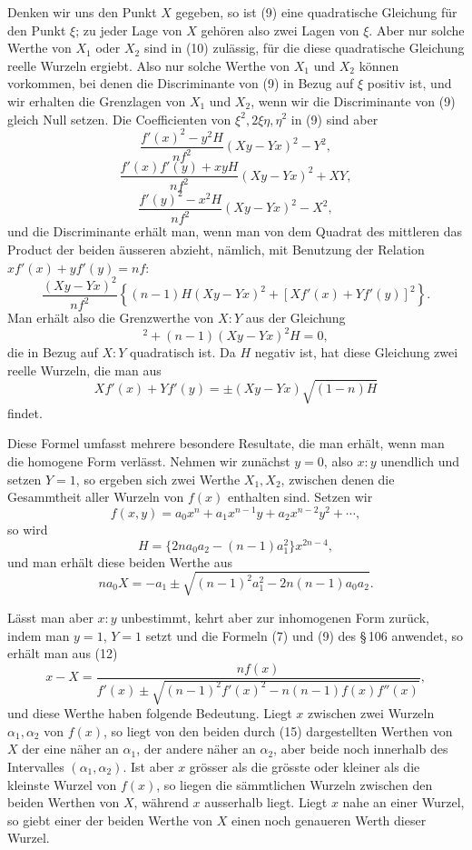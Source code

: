 \documentclass[11pt]{article}
\begin{document}
Denken wir uns den Punkt $X$ gegeben, so ist (9) eine quadratische Gleichung für den Punkt $\xi$; zu jeder Lage von $X$ gehören also zwei Lagen von $\xi$. Aber nur solche Werthe von $X_1$ oder $X_2$ sind in (10) zulässig, für die diese quadratische Gleichung reelle Wurzeln ergiebt. Also nur solche Werthe von $X_1$ und $X_2$ können vorkommen, bei denen die Discriminante von (9) in Bezug auf $\xi$ positiv ist, und wir erhalten die Grenzlagen von $X_1$ und $X_2$, wenn wir die Discriminante von (9) gleich Null setzen. Die Coefficienten von $\xi^2,2\xi\eta,\eta^2$ in (9) sind aber
\[
\frac{f'(x)^2-y^2H}{n f^2}(Xy-Yx)^2-Y^2,
\]
\[
\frac{f'(x)f'(y)+xyH}{n f^2}(Xy-Yx)^2+XY,
\]
\[
\frac{f'(y)^2-x^2H}{n f^2}(Xy-Yx)^2-X^2,
\]
und die Discriminante erhält man, wenn man von dem Quadrat des mittleren das Product der beiden äusseren abzieht, nämlich, mit Benutzung der Relation $xf'(x)+yf'(y)=nf$:
\[
        \frac{(Xy-Yx)^2}{n f^2}
        \left\{(n-1)H(Xy-Yx)^2+[Xf'(x)+Yf'(y)]^2\right\}.
\]
Man erhält also die Grenzwerthe von $X:Y$ aus der Gleichung
\begin{equation}
        [Xf'(x)+Yf'(y)]^2+(n-1)(Xy-Yx)^2H=0,
\tag{11}
\end{equation}
die in Bezug auf $X:Y$ quadratisch ist. Da $H$ negativ ist, hat diese Gleichung zwei reelle Wurzeln, die man aus
\begin{equation}
        Xf'(x)+Yf'(y)=\pm (Xy-Yx)\sqrt{(1-n)H}
\tag{12}
\end{equation}
findet.

Diese Formel umfasst mehrere besondere Resultate, die man erhält, wenn man die homogene Form verlässt. Nehmen wir zunächst $y=0$, also $x:y$ unendlich und setzen $Y=1$, so ergeben sich zwei Werthe $X_1,X_2$, zwischen denen die Gesammtheit aller Wurzeln von $f(x)$ enthalten sind. Setzen wir
\[
        f(x,y)=a_0x^n+a_1x^{n-1}y+a_2x^{n-2}y^2+\cdots,
\]
so wird
\begin{equation}
        H=\{2na_0a_2-(n-1)a_1^2\}x^{2n-4},
\tag{13}
\end{equation}
und man erhält diese beiden Werthe aus
\begin{equation}
        na_0X=-a_1\pm\sqrt{(n-1)^2a_1^2-2n(n-1)a_0a_2}.
\tag{14}
\end{equation}

Lässt man aber $x:y$ unbestimmt, kehrt aber zur inhomogenen Form zurück, indem man $y=1$, $Y=1$ setzt und die Formeln (7) und (9) des \S\,106 anwendet, so erhält man aus (12)
\begin{equation}
        x-X=\frac{n f(x)}
        {f'(x)\pm\sqrt{(n-1)^2f'(x)^2-n(n-1)f(x)f''(x)}},
\tag{15}
\end{equation}
und diese Werthe haben folgende Bedeutung. Liegt $x$ zwischen zwei Wurzeln $\alpha_1,\alpha_2$ von $f(x)$, so liegt von den beiden durch (15) dargestellten Werthen von $X$ der eine näher an $\alpha_1$, der andere näher an $\alpha_2$, aber beide noch innerhalb des Intervalles $(\alpha_1,\alpha_2)$. Ist aber $x$ grösser als die grösste oder kleiner als die kleinste Wurzel von $f(x)$, so liegen die sämmtlichen Wurzeln zwischen den beiden Werthen von $X$, während $x$ ausserhalb liegt. Liegt $x$ nahe an einer Wurzel, so giebt einer der beiden Werthe von $X$ einen noch genaueren Werth dieser Wurzel.
\end{document}
